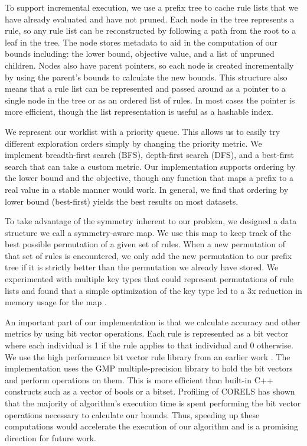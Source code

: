 \documentclass[format=sigconf]{acmart}
\begin{document}
To support incremental execution, we use a prefix tree to cache rule lists that we have already evaluated and have not pruned.
Each node in the tree represents a rule, so any rule list can be reconstructed by following a path from the root to a leaf in the tree.
The node stores metadata to aid in the computation of our bounds including: the lower bound, objective value, and a list of unpruned children.
Nodes also have parent pointers, so each node is created incrementally by using the parent's bounds to calculate the new bounds.
This structure also means that a rule list can be represented and passed around as a pointer to a single node in the tree or as an ordered list of rules.
In most cases the pointer is more efficient, though the list representation is useful as a hashable index.

We represent our worklist with a priority queue.
This allows us to easily try different exploration orders simply by changing the priority metric.
We implement breadth-first search (BFS), depth-first search (DFS), and a best-first search that can take a custom metric.
Our implementation supports ordering by the lower bound and the objective, though any function that maps a prefix to a real value in a stable manner would work.
In general, we find that ordering by lower bound (best-first) yields the best results on most datasets.

To take advantage of the symmetry inherent to our problem, we designed a data structure we call a symmetry-aware map.
We use this map to keep track of the best possible permutation of a given set of rules.
When a new permutation of that set of rules is encountered, we only add the new permutation to our prefix tree if it is strictly better than the permutation we already have stored.
We experimented with multiple key types that could represent permutations of rule lists and found that a simple optimization of the key type led to a 3x reduction in memory usage for the map \cite{Larus-Stone17}.

An important part of our implementation is that we calculate accuracy and other metrics by using bit vector operations.
Each rule is represented as a bit vector where each individual is 1 if the rule applies to that individual and 0 otherwise.
We use the high performance bit vector rule library from an earlier work \cite{YangRuSe16}.
The implementation uses the GMP multiple-precision library to hold the bit vectors and perform operations on them.
This is more efficient than built-in C++ constructs such as a vector of bools or a bitset.
Profiling of CORELS has shown that the majority of algorithm's execution time is spent performing the bit vector operations necessary to calculate our bounds.
Thus, speeding up these computations would accelerate the execution of our algorithm and is a promising direction for future work.
\end{document}
